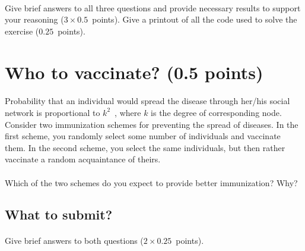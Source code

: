 \documentclass[11pt,a4paper]{article}
\newcommand{\points}[1]{({\color{magenta}$#1$~points})}
\newcommand{\totals}[1]{({\color{magenta}#1 points})}
\begin{document}
\paragraph{} Give brief answers to all three questions and provide necessary results to support your reasoning \points{3\times 0.5}. Give a printout of all the code used to solve the exercise \points{0.25}.

\section{Who to vaccinate? \totals{0.5}}

\paragraph{} Probability that an individual would spread the disease through her/his social network is proportional to $k^2$~\cite{New10}, where $k$ is the degree of corresponding node. Consider two immunization schemes for preventing the spread of diseases. In the first scheme, you randomly select some number of individuals and vaccinate them. In the second scheme, you select the same individuals, but then rather vaccinate a random acquaintance of theirs. 

\paragraph{} Which of the two schemes do you expect to provide better immunization? Why?

\subsection*{What to submit?}

\paragraph{} Give brief answers to both questions \points{2\times 0.25}.



\end{document}
